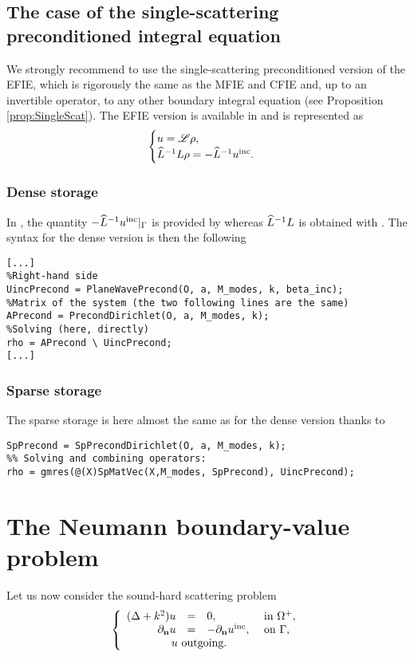 \subsection{The case of the single-scattering preconditioned integral equation}
\label{secEx:PrecondD}
We strongly recommend
 to use the single-scattering preconditioned version of the EFIE, which is rigorously the same as the MFIE and CFIE and, up to an invertible operator, 
 to any other boundary integral equation (see Proposition \ref{prop:SingleScat}). The EFIE version is available in \mudiff and is represented as
$$
\begin{cases}
u = {\mathscr L}\rho,\\
\widehat{L}^{-1} L \rho = -\widehat{L}^{-1}u^{\textrm{inc}}.
\end{cases}
$$

\subsubsection{Dense storage}

In \mudiff, the quantity $-\widehat{L}^{-1}u^{\textrm{inc}}|_{\Gamma}$ is provided by \PlaneWavePrecond whereas $\widehat{L}^{-1} L$ is obtained with \PrecondDirichlet. The syntax for the dense version is then the following
\begin{lstlisting}
[...]
%Right-hand side
UincPrecond = PlaneWavePrecond(O, a, M_modes, k, beta_inc);
%Matrix of the system (the two following lines are the same)
APrecond = PrecondDirichlet(O, a, M_modes, k);
%Solving (here, directly)
rho = APrecond \ UincPrecond;
[...]
\end{lstlisting}
\medskip

\subsubsection{Sparse storage}

The sparse storage is here almost the same as for the dense version thanks to \SpPrecondDirichlet
\begin{lstlisting}
SpPrecond = SpPrecondDirichlet(O, a, M_modes, k);
%% Solving and combining operators:
rho = gmres(@(X)SpMatVec(X,M_modes, SpPrecond), UincPrecond);
\end{lstlisting}
\medskip

\section{The Neumann boundary-value problem}

Let us now consider the sound-hard scattering problem
$$
\left\{\begin{array}{r c l l}
(\Delta +k^2)u & = & 0, & \text{ in }\Omegaps,\\
\dn u & = & -\dn \uinc, & \text{ on }\Gamma,\\
\multicolumn{4}{l}{\qquad \qquad u \text{ outgoing}.}
\end{array}\right.
$$


